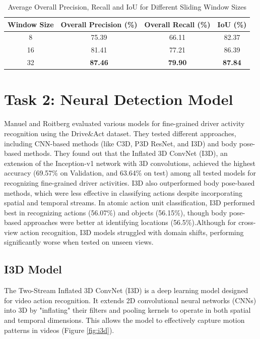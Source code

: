 \documentclass{article}
\begin{document}
\begin{table}[h]
    \renewcommand{\arraystretch}{1.5}
    \centering
    \begin{tabular}{c|c|c|c}
        \hline
        \textbf{Window Size} & \textbf{Overall Precision (\%)} & \textbf{Overall Recall (\%)} & \textbf{IoU (\%)} \\
        \hline
        8  & 75.39  & 66.11 & 82.37 \\
        16 & 81.41  & 77.21 & 86.39\\
        32 & \textbf{87.46}  & \textbf{79.90} & \textbf{87.84}\\
        \hline
    \end{tabular}
    \vspace{10pt}
    \caption{Average Overall Precision, Recall and IoU for Different Sliding Window Sizes}
    \label{tab:sliding_window_results}
\end{table}

\section{Task 2: Neural Detection Model}
Manuel and Roitberg \cite{drive_and_act_2019_iccv} evaluated various models for fine-grained driver activity recognition using the Drive\&Act dataset. They tested different approaches, including CNN-based methods (like C3D, P3D ResNet, and I3D) and body pose-based methods. They found out that the Inflated 3D ConvNet (I3D), an extension of the Inception-v1 network with 3D convolutions, achieved the highest accuracy (69.57\% on Validation, and 63.64\% on test) among all tested models for recognizing fine-grained driver activities.
I3D also outperformed body pose-based methods, which were less effective in classifying actions despite incorporating spatial and temporal streams.
In atomic action unit classification, I3D performed best in recognizing actions (56.07\%) and objects (56.15\%), though body pose-based approaches were better at identifying locations (56.5\%).Although for cross-view action recognition, I3D models struggled with domain shifts, performing significantly worse when tested on unseen views.
\subsection{I3D Model}
The Two-Stream Inflated 3D ConvNet (I3D) \cite{carreira2018quovadisactionrecognition} is a deep learning model designed for video action recognition. It extends 2D convolutional neural networks (CNNs) into 3D by "inflating" their filters and pooling kernels to operate in both spatial and temporal dimensions. This allows the model to effectively capture motion patterns in videos (Figure \ref{fig:i3d}).
\end{document}
